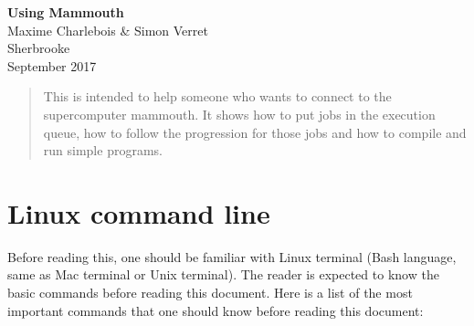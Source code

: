 \documentclass[10pt,letter]{article}
\begin{document}

\begin{centering}

\Large{\textbf{Using Mammouth}}\\
\normalsize{Maxime Charlebois \& Simon Verret}\\
\small{Sherbrooke\\ September 2017}

\end{centering}



\begin{abstract}
This is intended to help someone who wants to connect to the supercomputer mammouth. 
It shows how to put jobs in the execution queue, how to follow the progression for those jobs
and how to compile and run simple programs.
\end{abstract}

\tableofcontents

\renewcommand{\baselinestretch}{1.00}
\setlength{\parskip}{0.8\baselineskip}
\setlength{\parindent}{0mm}


\vspace{2mm}

\section{Linux command line}
Before reading this, one should be familiar with Linux terminal 
(Bash language, same as Mac terminal or Unix terminal). 
The reader is expected to know the basic commands before reading this document. 
Here is a list of the most important commands that one should know before reading this document:
\end{document}
